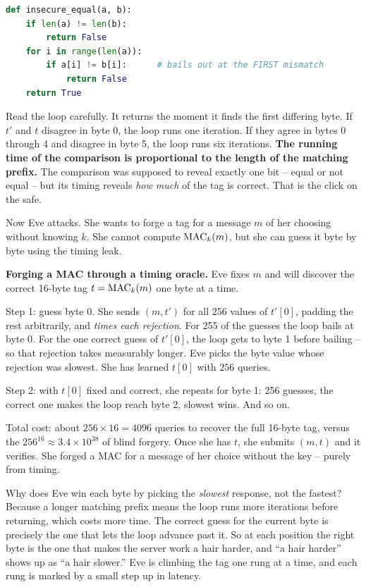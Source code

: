 \begin{lstlisting}[language=Python]
def insecure_equal(a, b):
    if len(a) != len(b):
        return False
    for i in range(len(a)):
        if a[i] != b[i]:      # bails out at the FIRST mismatch
            return False
    return True
\end{lstlisting}

Read the loop carefully. It returns the moment it finds the first differing byte. If $t'$ and $t$ disagree in byte 0, the loop runs one iteration. If they agree in bytes 0 through 4 and disagree in byte 5, the loop runs six iterations. \textbf{The running time of the comparison is proportional to the length of the matching prefix.} The comparison was supposed to reveal exactly one bit -- equal or not equal -- but its timing reveals \emph{how much} of the tag is correct. That is the click on the safe.

Now Eve attacks. She wants to forge a tag for a message $m$ of her choosing without knowing $k$. She cannot compute $\operatorname{MAC}_k(m)$, but she can guess it byte by byte using the timing leak.

\begin{attackbox}
\textbf{Forging a MAC through a timing oracle.} Eve fixes $m$ and will discover the correct 16-byte tag $t = \operatorname{MAC}_k(m)$ one byte at a time.

Step 1: guess byte 0. She sends $(m, t')$ for all 256 values of $t'[0]$, padding the rest arbitrarily, and \emph{times each rejection}. For 255 of the guesses the loop bails at byte 0. For the one correct guess of $t'[0]$, the loop gets to byte 1 before bailing -- so that rejection takes measurably longer. Eve picks the byte value whose rejection was slowest. She has learned $t[0]$ with $256$ queries.

Step 2: with $t[0]$ fixed and correct, she repeats for byte 1: 256 guesses, the correct one makes the loop reach byte 2, slowest wins. And so on.

Total cost: about $256 \times 16 = 4096$ queries to recover the full 16-byte tag, versus the $256^{16} \approx 3.4 \times 10^{38}$ of blind forgery. Once she has $t$, she submits $(m, t)$ and it verifies. She forged a MAC for a message of her choice without the key -- purely from timing.
\end{attackbox}

\begin{walkbox}
Why does Eve win each byte by picking the \emph{slowest} response, not the fastest? Because a longer matching prefix means the loop runs more iterations before returning, which costs more time. The correct guess for the current byte is precisely the one that lets the loop advance past it. So at each position the right byte is the one that makes the server work a hair harder, and ``a hair harder'' shows up as ``a hair slower.'' Eve is climbing the tag one rung at a time, and each rung is marked by a small step up in latency.
\end{walkbox}

